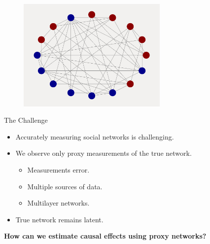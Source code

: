 \documentclass{beamer}
\begin{document}
    \begin{frame}[t]
        \begin{figure}[t]
            \centering
            \includegraphics[width=0.65\textwidth]{figs/connected_net.png}
        \end{figure}
    \end{frame}

    \begin{frame}{The Challenge}
        \large
        \begin{itemize}
            \item<1-> Accurately measuring social networks is challenging.
            \vspace{0.2cm}
            \item<1-> We observe only proxy measurements of the true network.
            \begin{itemize}
                \item Measurements error.
                \item Multiple sources of data.
                \item Multilayer networks.
            \end{itemize}
            \vspace{0.2cm}
            \item<1-> True network remains latent.
        \end{itemize}
        \vspace{.5cm}
        \begin{center}
            \Large
            \textbf{How can we estimate causal effects using proxy networks?}
        \end{center}
    \end{frame}
\end{document}
